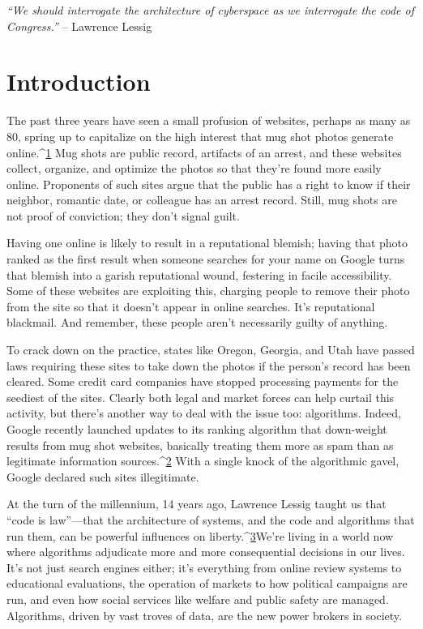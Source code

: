 \textit{``We should interrogate the architecture of cyberspace as we interrogate the code of Congress.''}
– Lawrence Lessig 
\chapter{Introduction}
The past three years have seen a small profusion of websites, perhaps as many as 80, spring up to capitalize on the high interest that mug shot photos generate online.^{\href{#endnotes}{1}} Mug shots are public record, artifacts of an arrest, and these websites collect, organize, and optimize the photos so that they're found more easily online. Proponents of such sites argue that the public has a right to know if their neighbor, romantic date, or colleague has an arrest record. Still, mug shots are not proof of conviction; they don't signal guilt. 

Having one online is likely to result in a reputational blemish; having that photo ranked as the first result when someone searches for your name on Google turns that blemish into a garish reputational wound, festering in facile accessibility. Some of these websites are exploiting this, charging people to remove their photo from the site so that it doesn't appear in online searches. It's reputational blackmail. And remember, these people aren't necessarily guilty of anything. 

To crack down on the practice, states like Oregon, Georgia, and Utah have passed laws requiring these sites to take down the photos if the person's record has been cleared. Some credit card companies have stopped processing payments for the seediest of the sites. Clearly both legal and market forces can help curtail this activity, but there's another way to deal with the issue too: algorithms. Indeed, Google recently launched updates to its ranking algorithm that down-weight results from mug shot websites, basically treating them more as spam than as legitimate information sources.^{\href{#endnotes}{2}} With a single knock of the algorithmic gavel, Google declared such sites illegitimate. 

At the turn of the millennium, 14 years ago, Lawrence Lessig taught us that ``code is law''—that the architecture of systems, and the code and algorithms that run them, can be powerful influences on liberty.^{\href{#endnotes}{3}}We're living in a world now where algorithms adjudicate more and more consequential decisions in our lives. It's not just search engines either; it's everything from online review systems to educational evaluations, the operation of markets to how political campaigns are run, and even how social services like welfare and public safety are managed. Algorithms, driven by vast troves of data, are the new power brokers in society. 

